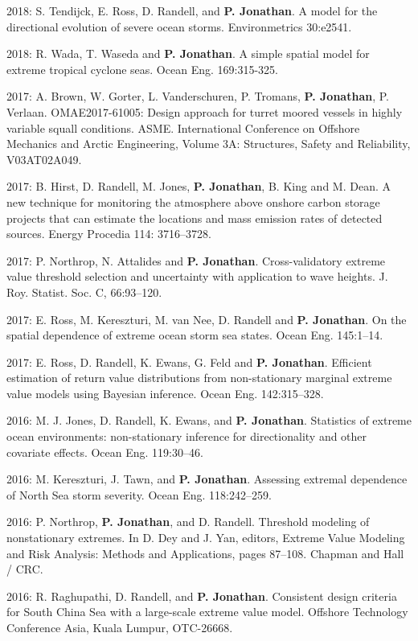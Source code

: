 \documentclass[11pt,a4paper]{moderncv}
\begin{document}
2018: S. Tendijck, E. Ross, D. Randell, and \textbf{P. Jonathan}. A model for the directional evolution of severe ocean storms. Environmetrics 30:e2541.

2018: R. Wada, T. Waseda and \textbf{P. Jonathan}. A simple spatial model for extreme tropical cyclone seas.  Ocean Eng. 169:315-325.

2017: A. Brown, W. Gorter, L. Vanderschuren, P. Tromans, \textbf{P. Jonathan}, P. Verlaan. OMAE2017-61005: Design approach for turret moored vessels in highly variable squall conditions. ASME. International Conference on Offshore Mechanics and Arctic Engineering, Volume 3A: Structures, Safety and Reliability, V03AT02A049.

2017: B. Hirst, D. Randell, M. Jones, \textbf{P. Jonathan}, B. King and M. Dean. A new technique for monitoring the atmosphere above onshore carbon storage projects that can estimate the locations and mass emission rates of detected sources.  Energy Procedia 114: 3716--3728.

2017: P. Northrop, N. Attalides and \textbf{P. Jonathan}. Cross-validatory extreme value threshold selection and uncertainty with application to wave heights. J. Roy. Statist. Soc. C, 66:93--120.

2017: E. Ross, M. Kereszturi, M. van Nee, D. Randell and \textbf{P. Jonathan}. On the spatial dependence of extreme ocean storm sea states. Ocean Eng. 145:1--14.

2017: E. Ross, D. Randell, K. Ewans, G. Feld and \textbf{P. Jonathan}. Efficient estimation of return value distributions from non-stationary marginal extreme value models using Bayesian inference. Ocean Eng. 142:315--328.

2016: M. J. Jones, D. Randell, K. Ewans, and \textbf{P. Jonathan}. Statistics of extreme ocean environments: non-stationary inference for directionality and other covariate effects. Ocean Eng. 119:30--46.

2016: M. Kereszturi, J. Tawn, and \textbf{P. Jonathan}. Assessing extremal dependence of North Sea storm severity. Ocean Eng. 118:242--259.

2016: P. Northrop, \textbf{P. Jonathan}, and D. Randell. Threshold modeling of nonstationary extremes. In D. Dey and J. Yan, editors, Extreme Value Modeling and Risk Analysis: Methods and Applications, pages 87--108. Chapman and Hall / CRC.

2016: R. Raghupathi, D. Randell, and \textbf{P. Jonathan}. Consistent design criteria for South China Sea with a large-scale extreme value model. Offshore Technology Conference Asia, Kuala Lumpur, OTC-26668.
\end{document}
